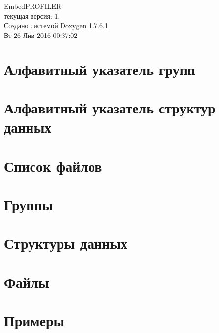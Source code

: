 \documentclass[a4paper]{book}
\begin{document}
\hypersetup{pageanchor=false,citecolor=blue}
\begin{titlepage}
\vspace*{7cm}
\begin{center}
{\Large \-Embed\-P\-R\-O\-F\-I\-L\-E\-R \\[1ex]\large текущая версия\-: 1. }\\
\vspace*{1cm}
{\large Создано системой Doxygen 1.7.6.1}\\
\vspace*{0.5cm}
{\small Вт 26 Янв 2016 00:37:02}\\
\end{center}
\end{titlepage}
\clearemptydoublepage
{}
\tableofcontents
\clearemptydoublepage
{}
\hypersetup{pageanchor=true,citecolor=blue}
\chapter{Алфавитный указатель групп}

\chapter{Алфавитный указатель структур данных}

\chapter{Список файлов}

\chapter{Группы}

\chapter{Структуры данных}


\chapter{Файлы}




\chapter{Примеры}

\printindex
\end{document}
